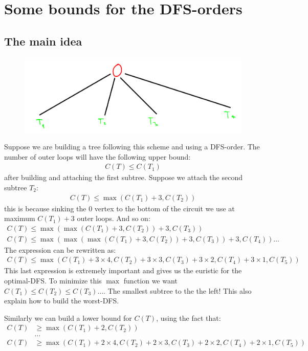 \documentclass{article}
\begin{document}
\newpage

\section{Some bounds for the DFS-orders}
\subsection{The main idea}
\begin{figure}[H]
    \includegraphics[width=\textwidth]{pics/building_scheme.png}
\end{figure}
Suppose we are building a tree following this scheme and using a DFS-order. The number of outer loops will have the following upper bound:
\begin{align}
    C(T) \leq C(T_1)
\end{align}
after building and attaching the first subtree.
Suppose we attach the second subtree $T_2$:
\begin{align}
    C(T) \leq \max{(C(T_1)+3, C(T_2))}
\end{align}
this is because sinking the $0$ vertex to the bottom of the circuit we use at maximum $C(T_1)+3$ outer loops. And so on:
\begin{align}
    C(T) \leq \max{(\max{(C(T_1)+3, C(T_2))}+3, C(T_3))}\\
    C(T) \leq \max{(\max{(\max{(C(T_1)+3, C(T_2))}+3, C(T_3))}+3, C(T_4))}
    \dots
\end{align}
The expression can be rewritten as:
\begin{align}
    C(T) \leq \max{(C(T_1)+3\times 4, C(T_2)+3\times 3, C(T_3)+3\times 2, C(T_4)+3\times 1, C(T_5))}
\end{align}
This last expression is extremely important and gives us the euristic for the optimal-DFS. To minimize this $\max$ function we want $C(T_1) \leq C(T_2) \leq C(T_3) \dots $. The smallest subtree to the the left! This also explain how to build the worst-DFS.

Similarly we can build a lower bound for $C(T)$, using the fact that:
\begin{align}
    C(T) &\geq \max{(C(T_1)+2, C(T_2))}\\
    &\dots\\
    C(T) &\geq \max{(C(T_1)+2\times 4, C(T_2)+2\times 3, C(T_3)+2\times 2, C(T_4)+2\times 1, C(T_5))}
\end{align}
\end{document}
